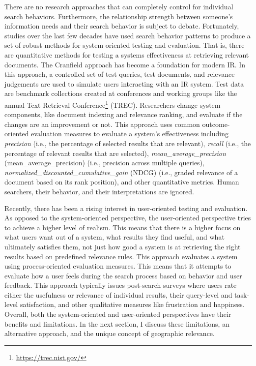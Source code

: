 There are no research approaches that can completely control for individual search behaviors. Furthermore, the relationship strength between someone's information needs and their search behavior is subject to debate. Fortunately, studies over the last few decades have used search behavior patterns to produce a set of robust methods for system-oriented testing and evaluation. That is, there are quantitative methods for testing a systems effectiveness at retrieving relevant documents. The Cranfield approach has become a foundation for modern IR. In this approach, a controlled set of test queries, test documents, and relevance judgements are used to simulate users interacting with an IR system. Test data are benchmark collections created at conferences and working groups like the annual Text Retrieval Conference\footnote{\url{https://trec.nist.gov/}} (\acrshort{TREC}). Researchers change system components, like document indexing and relevance ranking, and evaluate if the changes are an improvement or not. This approach uses common outcome-oriented evaluation measures to evaluate a system's effectiveness including \emph{\gls{precision}} (i.e., the percentage of selected results that are relevant), \emph{\gls{recall}} (i.e., the percentage of relevant results that are selected), \emph{\gls{mean_average_precision}} (\acrshort{mean_average_precision}) (i.e., precision across multiple queries), \emph{\gls{normalized_discounted_cumulative_gain}} (\acrshort{NDCG}) (i.e., graded relevance of a document based on its rank position), and other quantitative metrics. Human searchers, their behavior, and their interpretations are ignored.

Recently, there has been a rising interest in user-oriented testing and evaluation. As opposed to the system-oriented perspective, the user-oriented perspective tries to achieve a higher level of realism. This means that there is a higher focus on what users want out of a system, what results they find useful, and what ultimately satisfies them, not just how good a system is at retrieving the right results based on predefined relevance rules. This approach evaluates a system using process-oriented evaluation measures. This means that it attempts to evaluate how a user feels during the search process based on behavior and user feedback. This approach typically issues post-search surveys where users rate either the usefulness or relevance of individual results, their query-level and task-level satisfaction, and other qualitative measures like frustration and happiness. Overall, both the system-oriented and user-oriented perspectives have their benefits and limitations. In the next section, I discuss these limitations, an alternative approach, and the unique concept of geographic relevance.

